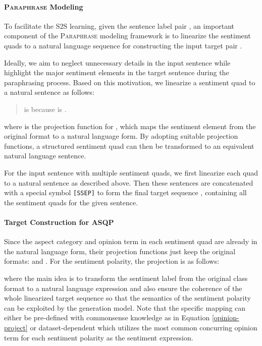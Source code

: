 \documentclass[11pt]{article}
\begin{document}
\paragraph{\textsc{Paraphrase} Modeling}
To facilitate the S2S learning, given the sentence label pair , an important component of the \textsc{Paraphrase} modeling framework is to linearize the sentiment quads  to a natural language sequence  for constructing the input target pair .


Ideally, we aim to neglect unnecessary details in the input sentence while highlight the major sentiment elements in the target sentence during the paraphrasing process. 
Based on this motivation, we linearize a sentiment quad  to a natural sentence as follows:
\begin{quote}
    \colorbox{mygray}{
     is  because  is  .
    } 
\end{quote}
where  is the projection function for , which maps the sentiment element  from the original format to a natural language form. By adopting suitable projection functions, a structured sentiment quad  can then be transformed to an equivalent natural language sentence.

For the input sentence  with multiple sentiment quads, we first linearize each quad  to a natural sentence as described above. Then these sentences are concatenated with a special symbol \verb|[SSEP]| to form the final target sequence , containing all the sentiment quads for the given sentence. 

\paragraph{Target Construction for ASQP} 
Since the aspect category  and opinion term  in each sentiment quad are already in the natural language form, their projection functions just keep the original formats:  and . For the sentiment polarity, the projection is as follows:

where the main idea is to transform the sentiment label from the original class format to a natural language expression and also ensure the coherence of the whole linearized target sequence so that the semantics of the sentiment polarity can be exploited by the generation model. Note that the specific mapping can either be pre-defined with commonsense knowledge as in Equation \ref{opinion-project} or dataset-dependent which utilizes the most common concurring opinion term for each sentiment polarity as the sentiment expression.
\end{document}
